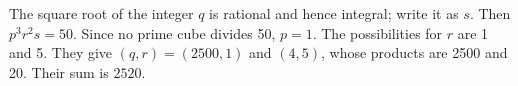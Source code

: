 The square root of the integer $q$ is rational and hence integral; write it as $s$. Then $p^3r^2s=50$. Since no prime cube divides 50, $p=1$. The possibilities for $r$ are 1 and 5. They give $(q,r)=(2500,1)$ and $(4,5)$, whose products are 2500 and 20. Their sum is $\boxed{2520}$.
